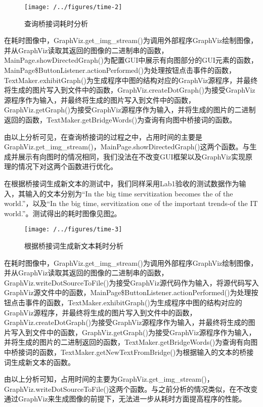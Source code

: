 \begin{figure}
\centering
\texttt{[image: /../figures/time-2]}
\caption{查询桥接词耗时分析}
\label{fig:time-2}
\end{figure}

在耗时图像中，GraphViz.get\_img\_stream()为调用外部程序GraphViz绘制图像，并从GraphViz读取其返回的图像的二进制串的函数，MainPage.showDirectedGraph()为配置GUI中展示有向图部分的GUI元素的函数，MainPage\$ButtonListener.actionPerformed()为处理按钮点击事件的函数，TextMaker.exhibitGraph()为生成程序中图的结构对应的GraphViz源程序，并最终将生成的图片写入到文件中的函数，GraphViz.createDotGraph()为接受GraphViz源程序作为输入，并最终将生成的图片写入到文件中的函数，GraphViz.getGraph()为接受GraphViz源程序作为输入，并将生成的图片的二进制返回的函数，TextMaker.getBridgeWords()为查询有向图中桥接词的函数。

由以上分析可见，在查询桥接词的过程之中，占用时间的主要是GraphViz.get\_img\_stream()，MainPage.showDirectedGraph()这两个函数。与生成并展示有向图时的情况相同，我们没法在不改变GUI框架以及GraphViz实现原理的情况下对这两个函数进行优化。

在根据桥接词生成新文本的测试中，我们同样采用Lab1验收的测试数据作为输入，其输入的文本分别为“In the big time servitization becomes the of the world.”，以及“In the big time, servitization one of the important trends-of the IT world.”。测试得出的耗时图像见图\ref{fig:time-3}。

\begin{figure}
\centering
\texttt{[image: /../figures/time-3]}
\caption{根据桥接词生成新文本耗时分析}
\label{fig:time-3}
\end{figure}

在耗时图像中，GraphViz.get\_img\_stream()为调用外部程序GraphViz绘制图像，并从GraphViz读取其返回的图像的二进制串的函数，GraphViz.writeDotSourceToFile()为接受GraphViz源代码作为输入，将源代码写入GraphViz源文件中的函数，MainPage\$ButtonListener.actionPerformed()为处理按钮点击事件的函数，TextMaker.exhibitGraph()为生成程序中图的结构对应的GraphViz源程序，并最终将生成的图片写入到文件中的函数，GraphViz.createDotGraph()为接受GraphViz源程序作为输入，并最终将生成的图片写入到文件中的函数，GraphViz.getGraph()为接受GraphViz源程序作为输入，并将生成的图片的二进制返回的函数，TextMaker.getBridgeWords()为查询有向图中桥接词的函数，TextMaker.getNewTextFromBridge()为根据输入的文本的桥接词生成新文本的函数。

由以上分析可知，占用时间的主要为GraphViz.get\_img\_stream()，GraphViz.writeDotSourceToFile()这两个函数。与之前分析的情况类似，在不改变通过GraphViz来生成图像的前提下，无法进一步从耗时方面提高程序的性能。

